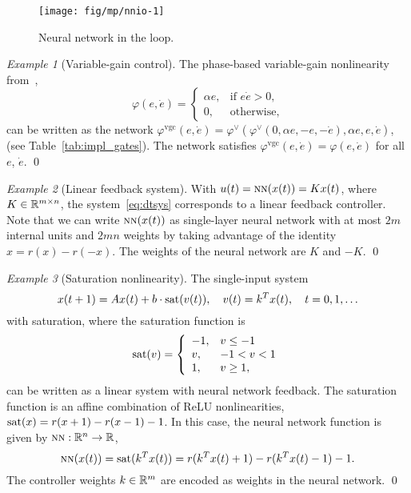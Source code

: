 \documentclass[10pt]{article}
\newcommand{\sat}{\mathop{\rm sat}}
\newcommand{\nn}{\mbox{\sc nn}}
\newcommand{\amn}{\varphi}
\theoremstyle{remark}
\newtheorem{example}{Example}
\theoremstyle{definition}
\theoremstyle{plain}
\begin{document}
\begin{figure}[htpb]
	\centering
	\texttt{[image: fig/mp/nnio-1]}
	\caption{Neural network in the loop.}
	\label{fig:nnio1}
\end{figure}

\begin{example}[Variable-gain control]
The phase-based variable-gain nonlinearity from~\cite[eq.~(4)]{Hunnekens:2016},
\[
	\varphi(e,\dot{e}) = \left\{
	\begin{array}{ll}
		\alpha e, & \text{if } e\dot{e} > 0,\\
		0, & \text{otherwise},
	\end{array}
	\right.
\]
can be written as the network
$\amn^\mathrm{vgc}(e,\dot{e})
=\amn^\vee(\amn^\vee(0,\alpha e, -e, -\dot{e}),\alpha e, e, \dot{e})$, (see
Table~\ref{tab:impl_gates}).  The network satisfies
$\amn^\mathrm{vgc}(e,\dot{e}) = \varphi(e,\dot{e})$ for all $e$, $\dot{e}$.
\qed
\end{example}

\begin{example}[Linear feedback system]
With $u(t) = \nn(x(t)) = K x(t)$, where $K \in \mathbb{R}^{m\times n}$, the
system~\eqref{eq:dtsys} corresponds to a linear feedback controller. Note that
we can write $\nn(x(t))$ as single-layer neural network with at most $2 m$
internal units and $2 m n$ weights by taking advantage of the identity $x=r(x)
- r(-x)$. The weights of the neural network are $K$ and $-K$.
\qed
\end{example}

\begin{example}[Saturation nonlinearity]
The single-input system~\cite[ex~2.1]{Johansson:2003}
\[
	x(t+1) = Ax(t) + b\cdot\sat(v(t)), 
	\quad v(t)=k^T x(t),
	\quad t = 0,1,\ldots
\]
with saturation, where the saturation function is
\[
	\sat(v) = \left\{
	\begin{array}{ll}
		-1, & v \leq -1\\
		v, & -1 < v < 1\\
		1, & v \geq 1,
	\end{array}
	\right.
\]
can be written as a linear system with neural network feedback.  The saturation
function is an affine combination of ReLU nonlinearities,
$\sat(x)=r(x+1)-r(x-1)-1$.  In this case, the neural network function is given
by $\nn:\reals^n \to \reals$, 
\[
	\nn(x(t)) 
	= \sat(k^T x(t)) 
	= r(k^Tx(t) + 1) - r(k^Tx(t) - 1) - 1.
\]
The controller weights $k\in\mathbb{R}^m$ are encoded as weights in the neural
network.
\qed
\end{example}
\end{document}
